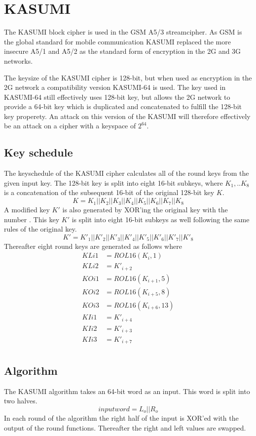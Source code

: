 \chapter{KASUMI}
\label{ch:kas}
The KASUMI block cipher is used in the GSM A5/3 streamcipher. As GSM
is the global standard for mobile communication KASUMI replaced the
more insecure A5/1 and A5/2 as the standard form of encryption in the
2G and 3G networks.

The keysize of the KASUMI cipher is 128-bit, but when used as
encryption in the 2G network a compatibility version KASUMI-64 is
used. The key used in KASUMI-64 still effectively uses 128-bit key,
but allows the 2G network to provide a 64-bit key which is duplicated
and concatenated to fulfill the 128-bit key properety. An attack on
this version of the KASUMI will therefore effectively be an attack on
a cipher with a keyspace of $2^{64}$.
\section{Key schedule}
The keyschedule of the KASUMI cipher calculates all of the round keys
from the given input key. The 128-bit key is split into eight 16-bit
subkeys, where $K_1,..K_8$ is a concatenation of the subsequent 16-bit of
the original 128-bit key $K$.
\[K = K_1 || K_2 || K_3 || K_4 || K_5 || K_6 || K_7 || K_8\]
A modified key $K'$ is also generated by XOR'ing the original key with
the number . This key $K'$ is split
into eight 16-bit subkeys as well following the same rules of the
original key.
\[K' = K'_1 || K'_2 || K'_3 || K'_4 || K'_5 || K'_6 || K'_7 || K'_8\]
Thereafter eight round keys are generated as follows where 
\begin{align*}
  KLi1 &= ROL16(K_i,1)\\
  KLi2 &= K'_{i+2}\\
  KOi1 &= ROL16(K_{i + 1},5)\\
  KOi2 &= ROL16(K_{i + 5},8)\\
  KOi3 &= ROL16(K_{i + 6},13)\\
  KIi1 &= K'_{i+4}\\
  KIi2 &= K'_{i+3}\\
  KIi3 &= K'_{i+7}\\
\end{align*}
\section{Algorithm}
The KASUMI algorithm takes an 64-bit word as an input. This word is
split into two halves.
\[ inputword = L_o || R_o\]
In each round of the algorithm the right half of the input is XOR'ed
with the output of the round functions. Thereafter the right and left
values are swapped.

